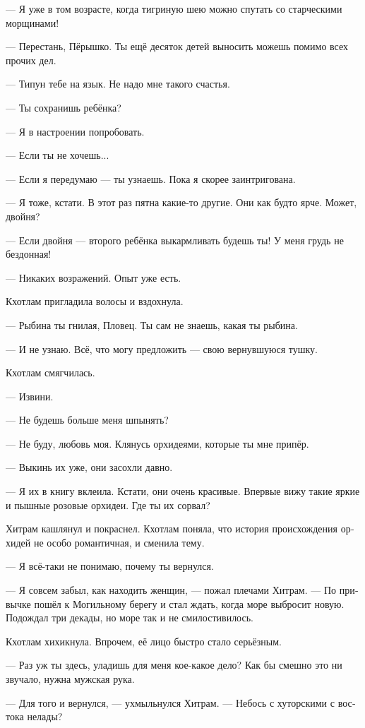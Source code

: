 \documentclass[a4paper,12pt,fleqn]{book}\usepackage{cooltooltips}\usepackage{polyglossia}\setdefaultlanguage{russian}\setotherlanguage{english}\defaultfontfeatures{Ligatures=TeX,Mapping=tex-text} \usepackage{xcolor}\definecolor{lightgray}{HTML}{bbbbbb}\color{lightgray}\newcommand{\ml}[3]{\textenglish{\textcolor{black}{#3}}}
\begin{document}
--- Я уже в том возрасте, когда тигриную шею можно спутать со старческими морщинами!

--- Перестань, Пёрышко.
Ты ещё десяток детей выносить можешь помимо всех прочих дел.

--- Типун тебе на язык.
Не надо мне такого счастья.

--- Ты сохранишь ребёнка?

--- Я в настроении попробовать.

--- Если ты не хочешь...

--- Если я передумаю --- ты узнаешь.
Пока я скорее заинтригована.

--- Я тоже, кстати.
В этот раз пятна какие-то другие.
Они как будто ярче.
Может, двойня?

--- Если двойня --- второго ребёнка выкармливать будешь ты!
У меня грудь не бездонная!

--- Никаких возражений.
Опыт уже есть.

Кхотлам пригладила волосы и вздохнула.

--- Рыбина ты гнилая, Пловец.
Ты сам не знаешь, какая ты рыбина.

--- И не узнаю.
Всё, что могу предложить --- свою вернувшуюся тушку.

Кхотлам смягчилась.

--- Извини.

--- Не будешь больше меня шпынять?

--- Не буду, любовь моя.
Клянусь орхидеями, которые ты мне припёр.

--- Выкинь их уже, они засохли давно.

--- Я их в книгу вклеила.
Кстати, они очень красивые.
Впервые вижу такие яркие и пышные розовые орхидеи.
Где ты их сорвал?

Хитрам кашлянул и покраснел.
Кхотлам поняла, что история происхождения орхидей не особо романтичная, и сменила тему.

--- Я всё-таки не понимаю, почему ты вернулся.

--- Я совсем забыл, как находить женщин, --- пожал плечами Хитрам.
--- По привычке пошёл к Могильному берегу и стал ждать, когда море выбросит новую.
Подождал три декады, но море так и не смилостивилось.

Кхотлам хихикнула.
Впрочем, её лицо быстро стало серьёзным.

--- Раз уж ты здесь, уладишь для меня кое-какое дело?
Как бы смешно это ни звучало, нужна мужская рука.

--- Для того и вернулся, --- ухмыльнулся Хитрам.
--- Небось с хуторскими с востока нелады?
\end{document}
